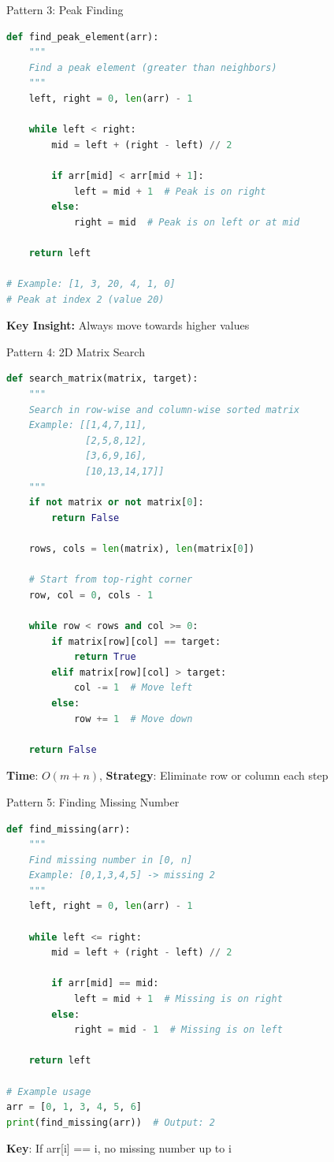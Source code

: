\documentclass[aspectratio=169]{beamer}
\begin{document}
\begin{frame}[fragile]{Pattern 3: Peak Finding}
\begin{lstlisting}[language=Python, basicstyle=\ttfamily\small]
def find_peak_element(arr):
    """
    Find a peak element (greater than neighbors)
    """
    left, right = 0, len(arr) - 1

    while left < right:
        mid = left + (right - left) // 2

        if arr[mid] < arr[mid + 1]:
            left = mid + 1  # Peak is on right
        else:
            right = mid  # Peak is on left or at mid

    return left

# Example: [1, 3, 20, 4, 1, 0]
# Peak at index 2 (value 20)
\end{lstlisting}

\textbf{Key Insight:} Always move towards higher values
\end{frame}

\begin{frame}[fragile]{Pattern 4: 2D Matrix Search}
\begin{lstlisting}[language=Python, basicstyle=\ttfamily\tiny]
def search_matrix(matrix, target):
    """
    Search in row-wise and column-wise sorted matrix
    Example: [[1,4,7,11],
              [2,5,8,12],
              [3,6,9,16],
              [10,13,14,17]]
    """
    if not matrix or not matrix[0]:
        return False

    rows, cols = len(matrix), len(matrix[0])

    # Start from top-right corner
    row, col = 0, cols - 1

    while row < rows and col >= 0:
        if matrix[row][col] == target:
            return True
        elif matrix[row][col] > target:
            col -= 1  # Move left
        else:
            row += 1  # Move down

    return False
\end{lstlisting}

\textbf{Time}: $O(m + n)$, \textbf{Strategy}: Eliminate row or column each step
\end{frame}

\begin{frame}[fragile]{Pattern 5: Finding Missing Number}
\begin{lstlisting}[language=Python, basicstyle=\ttfamily\small]
def find_missing(arr):
    """
    Find missing number in [0, n]
    Example: [0,1,3,4,5] -> missing 2
    """
    left, right = 0, len(arr) - 1

    while left <= right:
        mid = left + (right - left) // 2

        if arr[mid] == mid:
            left = mid + 1  # Missing is on right
        else:
            right = mid - 1  # Missing is on left

    return left

# Example usage
arr = [0, 1, 3, 4, 5, 6]
print(find_missing(arr))  # Output: 2
\end{lstlisting}

\textbf{Key}: If arr[i] == i, no missing number up to i
\end{frame}
\end{document}
